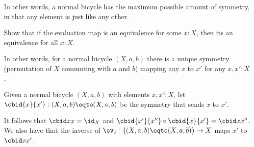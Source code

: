 In other words, a normal bicycle has the maximum possible
amount of symmetry, in that any element is just like any other.
\begin{xca}\label{xca:normal-bicycle-equiv}
  Show that if the evaluation map is an equivalence for some $x:X$,
  then its an equivalence for all $x:X$.
\end{xca}
In other words, for a normal bicycle $(X,a,b)$ there is a unique symmetry
(\ie permutation of $X$ commuting with $a$ and $b$)
mapping any $x$ to $x'$ for any $x,x':X$.
\begin{definition}\label{def:cbid-bicycle}
  Given a normal bicycle $(X,a,b)$ with elements $x,x':X$,
  let $\cbid{x}{x'} : (X,a,b) \eqto (X,a,b)$ be the
  symmetry that sends $x$ to $x'$.
\end{definition}
It follows that $\cbid xx = \id_X$ and $\cbid{x'}{x''} \circ \cbid{x}{x'}
= \cbid x{x''}$.
We also have that the inverse of $\ev_x: \bigl((X,a,b) \eqto (X,a,b)\bigr) \to X$
maps $x'$ to $\cbid x{x'}$.

